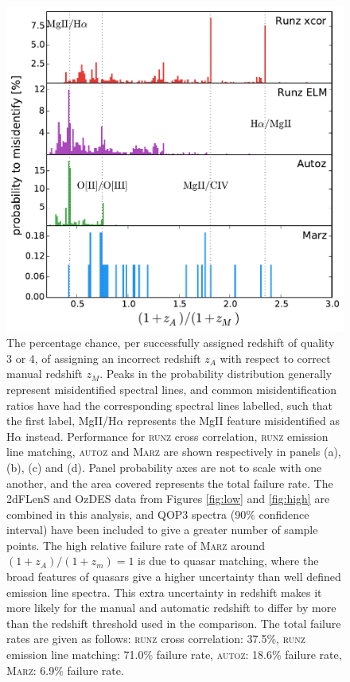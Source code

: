 \documentclass[iop]{emulateapj}
\newcommand{\runz}{\textsc{runz}}
\newcommand{\autoz}{\textsc{autoz}}
\newcommand{\marz}{\textsc{Marz}}
\begin{document}
\begin{figure}[h]
\centering
\includegraphics[width=\columnwidth]{errorRateqop3.pdf}
\caption{The percentage chance, per successfully assigned redshift of quality 3 or 4, of assigning an incorrect redshift $z_A$ with respect to correct manual redshift $z_M$. Peaks in the probability distribution generally represent misidentified spectral lines, and common misidentification ratios have had the corresponding spectral lines labelled, such that the first label, MgII/H$\alpha$ represents the MgII feature misidentified as H$\alpha$ instead. Performance for \runz{} cross correlation, \runz{} emission line matching, \autoz{} and \marz{} are shown respectively in panels (a), (b), (c) and (d). Panel probability axes are not to scale with one another, and the area covered represents the total failure rate. The 2dFLenS and OzDES data from Figures \ref{fig:low} and \ref{fig:high} are combined in this analysis, and QOP3 spectra (90\% confidence interval) have been included to give a greater number of sample points. The high relative failure rate of \marz{} around $(1+z_A)/(1+z_m) = 1$ is due to quasar matching, where the broad features of quasars give a higher uncertainty than well defined emission line spectra. This extra uncertainty in redshift makes it more likely for the manual and automatic redshift to differ by more than the redshift threshold used in the comparison. The total failure rates are given as follows: \runz{} cross correlation: 37.5\%, \runz{} emission line matching: 71.0\% failure rate, \autoz{}: 18.6\% failure rate, \marz{}: 6.9\% failure rate.}
\label{fig:f4}
\end{figure}
\end{document}
